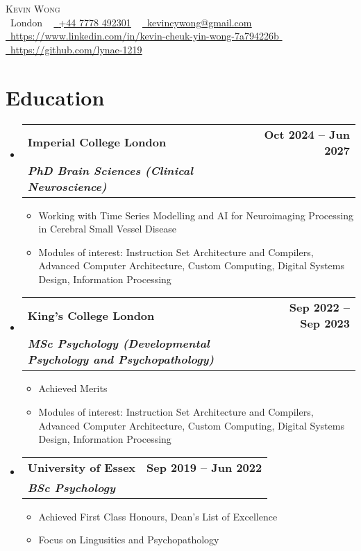 \documentclass[a4paper,11pt]{article}
\makeatletter
\newcommand{\resumeItem}[1]{
  \item\small{
    {#1 \vspace{-2pt}}
  }
}
\newcommand{\resumeSubheading}[4]{
  \vspace{-2pt}\item
    \begin{tabular*}{1.0\textwidth}[t]{l@{\extracolsep{\fill}}r}
      \textbf{#1} & \textbf{\small #2} \\
      \textbf{\textit{\small #3}} & \textit{\small #4} \\
    \end{tabular*}\vspace{-7pt}
}
\newcommand{\resumeSubHeadingListStart}{\begin{itemize}[leftmargin=0.0in, label={}] \setlength{\itemsep}{-5pt}}
\newcommand{\resumeSubHeadingListEnd}{\end{itemize}}
\newcommand{\resumeItemListStart}{\begin{itemize}}
\newcommand{\resumeItemListEnd}{\end{itemize}\vspace{-5pt}}
\makeatother
\begin{document}
\begin{center}
    \vspace*{-0.3in}
    {\Huge \scshape Kevin Wong} \\ \vspace{3pt}
    \small \raisebox{-0.1\height}\faMapMarker\ London ~
    \href{tel:+447778492301}{\raisebox{-0.2\height}\faPhone\  \underline{+44 7778 492301}} ~
    \href{mailto:kevincywong@gmail.com}{\raisebox{-0.2\height}\faEnvelope\  \underline{kevincywong@gmail.com}} \\
    \vspace{1pt}
    \href{https://www.linkedin.com/in/kevin-cheuk-yin-wong-7a794226b }{\raisebox{-0.2\height}\faLinkedin\ \underline{https://www.linkedin.com/in/kevin-cheuk-yin-wong-7a794226b }} ~
    \href{https://github.com/lynae-1219}{\raisebox{-0.2\height}\faGithub\ \underline{https://github.com/lynae-1219}}
    \vspace{-8pt}
\end{center}

\section{Education}
\resumeSubHeadingListStart
\resumeSubheading
{Imperial College London}{Oct 2024 -- Jun 2027}
{PhD Brain Sciences (Clinical Neuroscience)}{}
\resumeItemListStart
\resumeItem{Working with Time Series Modelling and AI for Neuroimaging Processing in Cerebral Small Vessel Disease}
\resumeItem{Modules of interest: Instruction Set Architecture and Compilers, Advanced Computer Architecture, Custom Computing, Digital Systems Design, Information Processing}
\resumeItemListEnd
\resumeSubHeadingListEnd

\resumeSubHeadingListStart
\resumeSubheading
{King's College London}{Sep 2022 -- Sep 2023}
{MSc Psychology (Developmental Psychology and Psychopathology)}{}
\resumeItemListStart
\resumeItem{Achieved Merits}
\resumeItem{Modules of interest: Instruction Set Architecture and Compilers, Advanced Computer Architecture, Custom Computing, Digital Systems Design, Information Processing}
\resumeItemListEnd
\resumeSubHeadingListEnd

\resumeSubHeadingListStart
\resumeSubheading
{University of Essex }{Sep 2019 -- Jun 2022}
{BSc Psychology}{}
\resumeItemListStart
\resumeItem{Achieved First Class Honours, Dean's List of Excellence}
\resumeItem{Focus on Lingusitics and Psychopathology}
\resumeItemListEnd
\resumeSubHeadingListEnd
\end{document}
